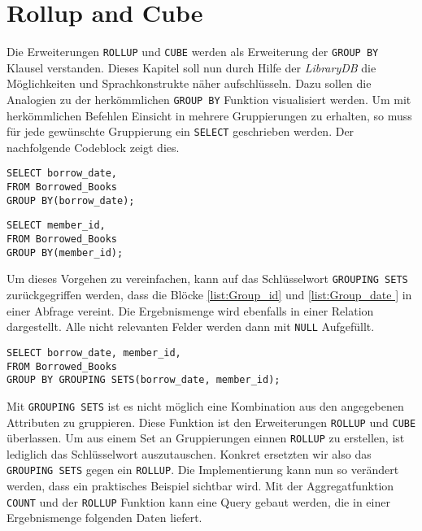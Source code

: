 \section{Rollup and Cube}
Die Erweiterungen \texttt{ROLLUP} und \texttt{CUBE} werden als Erweiterung der \texttt{GROUP
BY} Klausel verstanden. Dieses Kapitel soll nun durch Hilfe der \textit{LibraryDB}
die Möglichkeiten und Sprachkonstrukte näher aufschlüsseln. Dazu sollen die Analogien
zu der herkömmlichen \texttt{GROUP BY} Funktion visualisiert werden. Um mit herkömmlichen
Befehlen Einsicht in mehrere Gruppierungen zu erhalten, so muss für jede
gewünschte Gruppierung ein \texttt{SELECT} geschrieben werden. Der nachfolgende
Codeblock zeigt dies.

\begin{minipage}{0.45\textwidth}
	 \begin{lstlisting}
SELECT borrow_date,
FROM Borrowed_Books
GROUP BY(borrow_date);
	\end{lstlisting}
\end{minipage}
\hfill
\begin{minipage}{0.45\textwidth}
	 \begin{lstlisting}
SELECT member_id,
FROM Borrowed_Books
GROUP BY(member_id);
	\end{lstlisting}
\end{minipage}

Um dieses Vorgehen zu vereinfachen, kann auf das Schlüsselwort \texttt{GROUPING
SETS} zurückgegriffen werden, dass die Blöcke \ref{list:Group_id} und
\ref{list:Group_date } in einer Abfrage vereint. Die Ergebnismenge wird ebenfalls
in einer Relation dargestellt. Alle nicht relevanten Felder werden dann mit
\texttt{NULL} Aufgefüllt.

\begin{lstlisting}
SELECT borrow_date, member_id,
FROM Borrowed_Books
GROUP BY GROUPING SETS(borrow_date, member_id);
\end{lstlisting}

Mit \texttt{GROUPING SETS} ist es nicht möglich eine Kombination aus den angegebenen
Attributen zu gruppieren. Diese Funktion ist den Erweiterungen \texttt{ROLLUP} und
\texttt{CUBE} überlassen. Um aus einem Set an Gruppierungen einnen \texttt{ROLLUP}
zu erstellen, ist lediglich das Schlüsselwort auszutauschen. Konkret ersetzten
wir also das \texttt{GROUPING SETS} gegen ein \texttt{ROLLUP}. Die Implementierung
kann nun so verändert werden, dass ein praktisches Beispiel sichtbar wird. Mit der
Aggregatfunktion \texttt{COUNT} und der \texttt{ROLLUP} Funktion kann eine Query
gebaut werden, die in einer Ergebnismenge folgenden Daten liefert.


